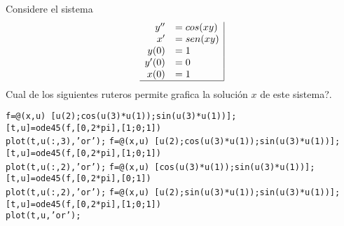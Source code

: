 \begin{pregunta}
\begin{cuerpo}
Considere el sistema
$$
\begin{array}{rl|}
y''	&=cos(xy)\\
x'	&=sen(xy)\\
y(0)	&=1\\
y'(0)	&=0\\
x(0)	&=1\\ \hline
\end{array}
$$
\textquestiondown Cual de los siguientes ruteros permite grafica la soluci\'on $x$ de este sistema?.
\end{cuerpo}

\begin{alternativas}
{
\texttt{f=@(x,u) [u(2);cos(u(3)*u(1));sin(u(3)*u(1))];}  \\
\texttt{[t,u]=ode45(f,[0,2*pi],[1;0;1])}				\\
\texttt{plot(t,u(:,3),'or');}							
}
{
\texttt{f=@(x,u) [u(2);cos(u(3)*u(1));sin(u(3)*u(1))];}  \\
\texttt{[t,u]=ode45(f,[0,2*pi],[1;0;1])}				\\
\texttt{plot(t,u(:,2),'or');}							
}
{
\texttt{f=@(x,u) [cos(u(3)*u(1));sin(u(3)*u(1))];}  \\
\texttt{[t,u]=ode45(f,[0,2*pi],[0;1])}				\\
\texttt{plot(t,u(:,2),'or');}							
}
{
\texttt{f=@(x,u) [u(2);sin(u(3)*u(1));sin(u(3)*u(1))];}  \\
\texttt{[t,u]=ode45(f,[0,2*pi],[1;0;1])}				\\
\texttt{plot(t,u,'or');}							
}
\end{alternativas}

\justificacion{0cm}
\end{pregunta}